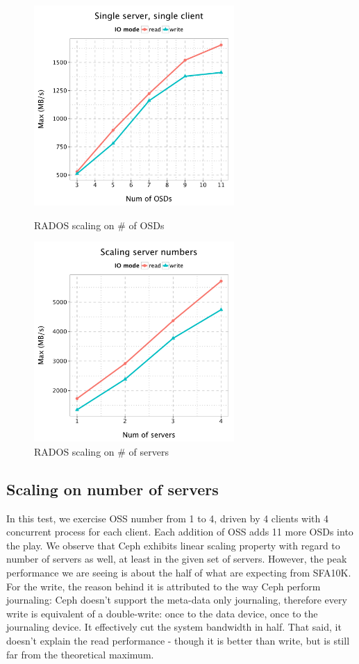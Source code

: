 \documentclass{article}
\begin{document}
\begin{figure}[H]
\centering
\begin{minipage}[t]{0.5\linewidth}
\centering
\includegraphics[width=3in]{data/rados_osd}
\caption{RADOS scaling on \# of OSDs}
\label{fig:osd-scale}
\end{minipage}%
\begin{minipage}[t]{0.5\linewidth}
\centering
\includegraphics[width=3in]{data/rados_server}
\caption{RADOS scaling on \# of servers}
\label{fig:oss-scale}
\end{minipage}%
\end{figure}

\subsection{Scaling on number of servers}

In this test, we exercise OSS number from 1 to 4, driven by 4 clients with 4
concurrent process for each client. Each addition of OSS adds 11 more OSDs into
the play. We observe that Ceph exhibits linear scaling property with regard to
number of servers as well, at least in the given set of servers. However, the peak
performance we are seeing is about the half of what are expecting from SFA10K.
For the write, the reason behind it is attributed to the way Ceph perform
journaling: Ceph doesn't support the meta-data only journaling, therefore every
write is equivalent of a double-write: once to the data device, once to the
journaling device. It effectively cut the system bandwidth in half. That said,
it doesn't explain the read performance - though it is better than write, but is
still far from the theoretical maximum.
\end{document}
